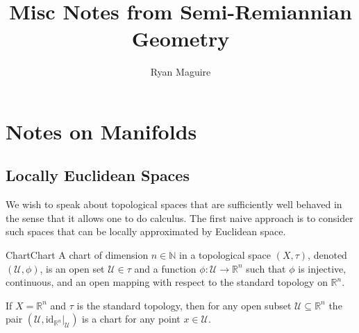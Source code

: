\documentclass[oneside]{book}                                                  %
\begin{document}
    \title{Misc Notes from Semi-Remiannian Geometry}
    \author{Ryan Maguire}
    \date{\vspace{-5ex}}
    \maketitle
    \tableofcontents
    \chapter{Notes on Manifolds}
        \section{Locally Euclidean Spaces}
            We wish to speak about topological spaces that are sufficiently well
            behaved in the sense that it allows one to do calculus. The first
            naive approach is to consider such spaces that can be locally
            approximated by Euclidean space.
            \begin{fdefinition}{Chart}{Chart}
                A chart of dimension $n\in\mathbb{N}$ in a topological space
                $(X,\tau)$, denoted $(\mathcal{U},\phi)$, is an open set
                $\mathcal{U}\in\tau$ and a function
                $\phi:\mathcal{U}\rightarrow\mathbb{R}^{n}$ such that $\phi$ is
                injective, continuous, and an open mapping with respect to the
                standard topology on $\mathbb{R}^{n}$.
            \end{fdefinition}
            \begin{example}
                If $X=\mathbb{R}^{n}$ and $\tau$ is the standard topology, then
                for any open subset $\mathcal{U}\subseteq\mathbb{R}^{n}$ the
                pair $(\mathcal{U},\textrm{id}_{\mathbb{R}^{n}}|_{\mathcal{U}})$
                is a chart for any point $x\in\mathcal{U}$.
            \end{example}
\end{document}
